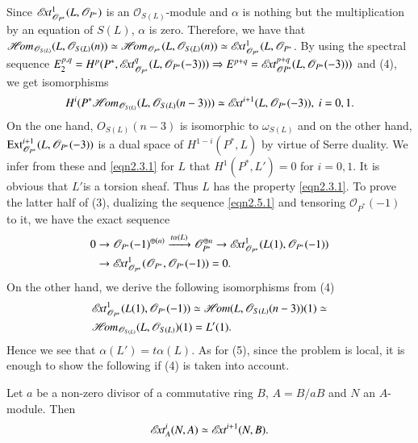 \begin{Proof}
Since $\mathscr{E}\!{\it xt}^{1}_{\mathscr{O}_{P^{\ast}}}(L,\mathscr{O}_{P^{\ast}})$ is an
$\mathscr{O}_{S(L)}$-module and $\alpha$ is nothing but the
multiplication by an equation of $S(L)$, $\alpha$ is zero. Therefore,
we have that $\mathscr{H}\!{\it om}_{\mathscr{O}_{S(L)}}(L,\mathscr{O}_{S(L)}(n))\simeq
\mathscr{H}\!{\it om}_{\mathscr{O}_{P^{\ast}}}(L,\mathscr{O}_{S(L)}(n))\simeq \mathscr{E}\!{\it xt}^{1}_{\mathscr{O}_{P^{\ast}}}(L,\mathscr{O}_{P^{\ast}}$. By
using the spectral sequence
$E^{p,q}_2=H^{p}(P^{\ast},\mathscr{E}\!{\it xt}^{q}_{\mathscr{O}_{P^{\ast}}}(L,\mathscr{O}_{P^{\ast}}(-3)))\Rightarrow
E^{p+q}=\mathscr{E}\!{\it xt}^{p+q}_{\mathscr{O}P^{\ast}}(L,\mathscr{O}_{P^{\ast}}(-3)))$
and (4), we get isomorphisms
$$
H^{i}(P^{\ast}\mathscr{H}\!{\it om}_{\mathscr{O}_{S(L)}}(L,\mathscr{O}_{S(L)}(n-3)))\simeq
\mathscr{E}\!{\it xt}^{i+1}(L,\mathscr{O}_{P^{\ast}}(-3)), \ i=0,1.
$$ 
On the one hand,
$O_{S(L)}(n-3)$ is isomorphic to $\omega_{S(L)}$ and on the other
hand,
$\operatorname{Ext}^{i+1}_{\mathscr{O}_{P^{\ast}}}(L,\mathscr{O}_{P^{\ast}}(-3))$ is
a dual space of $H^{1-i}(P^{\ast},L)$ by virtue of Serre duality. We
infer from these and \eqref{eqn2.3.1} for $L$ that
$H^{1}(P^{\ast}, L')=0$ for $i=0,1$. It is obvious that
$L'$\pageoriginale is a torsion sheaf. Thus $L$ has the
property \eqref{eqn2.3.1}. To prove 
the latter half of (3), dualizing the sequence \eqref{eqn2.5.1} and
tensoring $\mathscr{O}_{P^{\ast}}(-1)$ to it, we have the exact
sequence 
\begin{align*}
0 &\to
\mathscr{O}_{P^{\ast}}(-1)^{\oplus(n)}\xrightarrow{t\alpha(L)}\mathscr{O}^{\oplus
  n}_{P^{\ast}}\to 
\mathscr{E}\!{\it xt}^{1}_{\mathscr{O}_{P^{\ast}}}(L(1),\mathscr{O}_{P^{\ast}}(-1))\\
&\to \mathscr{E}\!{\it xt}^{1}_{\mathscr{O}_{P^{\ast}}}(\mathscr{O}_{P^{\ast}},\mathscr{O}_{P^{\ast}}(-1))=0.
\end{align*}
On the other hand, we derive the following isomorphisms from (4)
\begin{align*}
& \mathscr{E}\!{\it xt}^{1}_{\mathscr{O}_{P^{\ast}}}(L(1),\mathscr{O}_{P^{\ast}}(-1))\simeq
\mathscr{H}\!{\it om}(L,\mathscr{O}_{S(L)}(n-3))(1)\simeq\\
&\mathscr{H}\!{\it om}_{\mathscr{O}_{S(L)}}(L,\mathscr{O}_{S(L)})(1)=L'(1).
\end{align*}
Hence we see that $\alpha(L')=t\alpha(L)$. As for (5), since the
problem is local, it is enough to show the following if (4) is taken
into account.
\enprf
\end{Proof}

\begin{lemma}\label{lemma2.10}
Let $a$ be a non-zero divisor of a commutative ring $B$,
$A=B/aB$ and $N$ an $A$-module. Then 
$$
\mathscr{E}\!{\it xt}^{i}_A(N,A)\simeq \mathscr{E}\!{\it xt}^{i+1}(N,B).
$$
\end{lemma}

